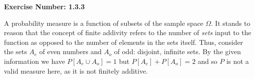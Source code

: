 \documentclass{article}
\begin{document}
\textbf{Exercise Number: 1.3.3}  %

\medskip 

\noindent A probability measure is a function of subsets of the sample space $\Omega$. It stands to reason that the concept of finite addivity refers to the number of \emph{sets} input to the function as opposed to the number of elements in the sets itself. Thus, consider the sets $A_e$ of even numbers and $A_o$ of odd: disjoint, infinite sets. By the given information we have $P[A_e \cup A_o] = 1$ but $P[A_e] + P[A_o] = 2$ and so $P$ is not a valid measure here, as it is not finitely additive. 
\end{document}
